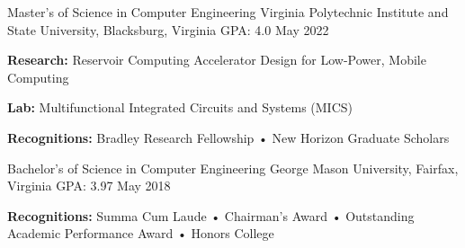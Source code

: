 


\begin{cventries}

\cventry
{Master's of Science in Computer Engineering} %
{Virginia Polytechnic Institute and State University, Blacksburg, Virginia} %
{GPA: 4.0 } %
{May 2022} %
{
\begin{cvitems}
\item {\textbf{Research:} Reservoir Computing Accelerator Design for Low-Power, Mobile Computing}
\item {\textbf{Lab:} Multifunctional Integrated Circuits and Systems (MICS)}
\item {\textbf{Recognitions:} Bradley Research Fellowship • New Horizon Graduate Scholars}
\end{cvitems}
}
\cventry
{Bachelor's of Science in Computer Engineering} %
{George Mason University, Fairfax, Virginia} %
{GPA: 3.97 } %
{May 2018} %
{
\begin{cvitems}
\item {\textbf{Recognitions:} Summa Cum Laude • Chairman's Award • Outstanding Academic Performance Award • Honors College}
\end{cvitems}
}


\end{cventries}